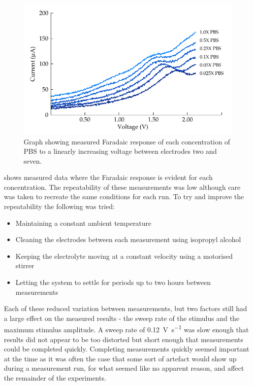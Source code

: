       \begin{figure}
        \centering
        \includegraphics{content/pt2/08-InterfaceParameters/graphics/faradaicOnset-all-average}
        \caption{\label{fig:pt2-faradaic_measurement}Graph showing measured Faradaic response of each concentration of PBS to a linearly increasing voltage between electrodes two and seven.}
      \end{figure}

       shows measured data where the Faradaic response is evident for each concentration.
      The repeatability of these measurements was low although care was taken to recreate the same conditions for each run.
      To try and improve the repeatability the following was tried:
      \begin{itemize}
        \item Maintaining a constant ambient temperature
        \item Cleaning the electrodes between each measurement using isopropyl alcohol
        \item Keeping the electrolyte moving at a constant velocity using a motorised stirrer
        \item Letting the system to settle for periods up to two hours between measurements
      \end{itemize}
      Each of these reduced variation between measurements, but two factors still had a large effect on the measured results - the sweep rate of the stimulus and the maximum stimulus amplitude.
      A sweep rate of \SI{0.12}{\volt\per\second} was slow enough that results did not appear to be too distorted but short enough that measurements could be completed quickly.
      Completing measurements quickly seemed important at the time as it was often the case that some sort of artefact would show up during a measurement run, for what seemed like no apparent reason, and affect the remainder of the experiments.

